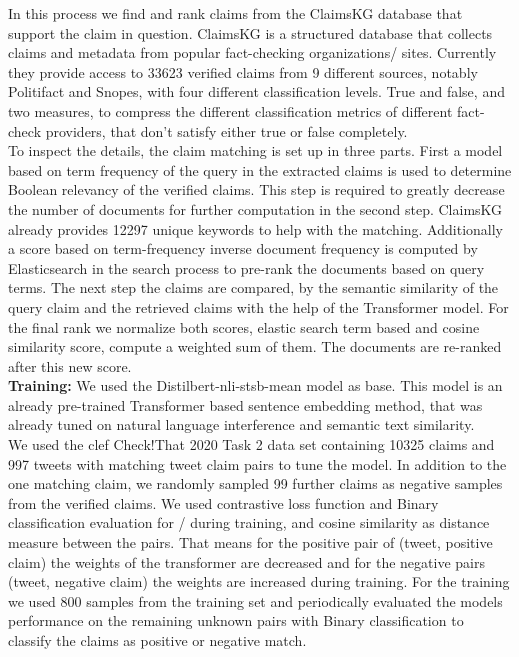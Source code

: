 \documentclass{article}
\begin{document}
In this process we find and rank claims from the ClaimsKG database that support the claim in question.
ClaimsKG is a structured database that collects claims and metadata from popular fact-checking organizations/ sites. 
Currently they provide access to 33623 verified claims from 9 different sources, notably Politifact and Snopes,  with four different classification levels. 
True and false, and two measures, to compress the different classification metrics of different fact-check providers, that don't satisfy either true or false completely.\\
To inspect the details, the claim matching is set up in three parts.
First a model based on term frequency of the query in the extracted claims is used to determine Boolean relevancy of the verified claims.
This step is required to greatly decrease the number of documents for further computation in the second step.
ClaimsKG already provides 12297 unique keywords to help with the matching.
Additionally a score based on term-frequency inverse document frequency is computed by Elasticsearch in the search process to pre-rank the documents based on query terms.
The next step the claims are compared, by the semantic similarity of the query claim and the retrieved claims with the help of the Transformer model.
For the final rank we normalize both scores, elastic search term based and cosine similarity score, compute a weighted sum of them.
The documents are re-ranked after this new score.\\
\noindent\textbf{Training:}
We used the Distilbert\cite{DBLP:journals/corr/abs-1910-01108}-nli-stsb-mean model as base.  
This model is an already pre-trained Transformer based sentence embedding method, that was already tuned on natural language interference and semantic text similarity.\\
We used the clef Check!That 2020\cite{DBLP:conf/ecir/Barron-CedenoEN20} Task 2 data set containing 10325 claims and 997 tweets with matching tweet claim pairs to tune the model.
In addition to the one matching claim, we randomly sampled 99 further claims as negative samples from the verified claims.
We used contrastive loss function and Binary classification evaluation for / during training, and cosine similarity as distance measure between the pairs. 
That means for the positive pair of (tweet, positive claim) the weights of the transformer are decreased and for the negative pairs (tweet, negative claim) the weights are increased during training.
For the training we used 800 samples from the training set and periodically evaluated the models performance on the remaining unknown pairs with Binary classification to classify the claims as positive or negative match.\\
\end{document}
